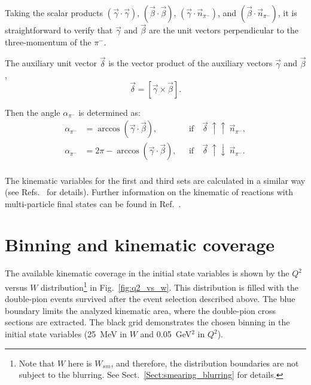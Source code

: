 Taking the scalar products $(\vec \gamma \cdot \vec  \gamma)$, $(\vec \beta \cdot \vec  \beta)$, $(\vec \gamma \cdot \vec n_{\pi^{-}})$, and $(\vec \beta \cdot \vec n_{\pi^{-}})$, it is straightforward to verify that $\vec \gamma$ and $\vec  \beta$ are the unit vectors perpendicular to the three-momentum of the $\pi^{-}$.

The auxiliary unit vector $\vec \delta$ is the vector product of the auxiliary vectors $\vec \gamma$ and $\vec \beta$, 
\begin{equation}
\vec \delta = [ \vec \gamma \times \vec \beta ].
\end{equation}

Then the angle $\alpha_{\pi^{-}}$ is determined as:\vspace{-1em}
\begin{equation}
\begin{aligned}
\alpha_{\pi^{-}} &= \arccos(\vec \gamma \cdot \vec \beta),&\text{~~if~~~} \vec \delta~\uparrow\uparrow~\vec n_{\pi^{-}},\\
\alpha_{\pi^{-}} &= 2\pi - \arccos(\vec \gamma \cdot \vec \beta),&\text{~~if~~~} \vec \delta~\uparrow\downarrow~\vec n_{\pi^{-}}.\\[-30pt] \label{eq:cr_sec_anglealpha}
\end{aligned}
\end{equation}

The kinematic variables for the first and third sets are calculated in a similar way (see Refs.~\cite{my_an_note:2020,Fed_an_note:2017} for details). Further information on the kinematic of reactions with multi-particle final states can be found in Ref.~\cite{Byckling:1971vca}.


\section{Binning and kinematic coverage}
\label{Sect:binning}

The available kinematic coverage in the initial state variables is shown by the $Q^2$ versus $W$ distribution\footnote[7]{Note that $W$ here is $W_{sm}$, and therefore, the distribution boundaries are not subject to the blurring. See Sect.~\ref{Sect:smearing_blurring} for details.} in Fig.~\ref{fig:q2_vs_w}. This distribution is filled with the double-pion events survived after the event selection described above. The blue boundary limits the analyzed kinematic area, where the double-pion cross sections are extracted. The black grid demonstrates the chosen binning in the initial state variables (25~MeV in $W$ and 0.05~GeV$^{2}$ in $Q^{2}$).

